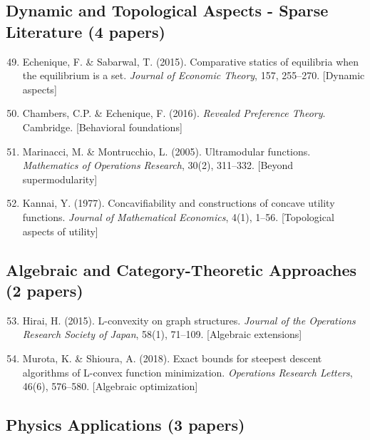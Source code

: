 \subsection{Dynamic and Topological Aspects - Sparse Literature (4 papers)}

\begin{enumerate}
    \setcounter{enumi}{48}
    \item Echenique, F. \& Sabarwal, T. (2015). Comparative statics of equilibria when the equilibrium is a set. \textit{Journal of Economic Theory}, 157, 255--270. [Dynamic aspects]

    \item Chambers, C.P. \& Echenique, F. (2016). \textit{Revealed Preference Theory}. Cambridge. [Behavioral foundations]

    \item Marinacci, M. \& Montrucchio, L. (2005). Ultramodular functions. \textit{Mathematics of Operations Research}, 30(2), 311--332. [Beyond supermodularity]

    \item Kannai, Y. (1977). Concavifiability and constructions of concave utility functions. \textit{Journal of Mathematical Economics}, 4(1), 1--56. [Topological aspects of utility]
\end{enumerate}

\subsection{Algebraic and Category-Theoretic Approaches (2 papers)}

\begin{enumerate}
    \setcounter{enumi}{52}
    \item Hirai, H. (2015). L-convexity on graph structures. \textit{Journal of the Operations Research Society of Japan}, 58(1), 71--109. [Algebraic extensions]

    \item Murota, K. \& Shioura, A. (2018). Exact bounds for steepest descent algorithms of L-convex function minimization. \textit{Operations Research Letters}, 46(6), 576--580. [Algebraic optimization]
\end{enumerate}

\subsection{Physics Applications (3 papers)}

